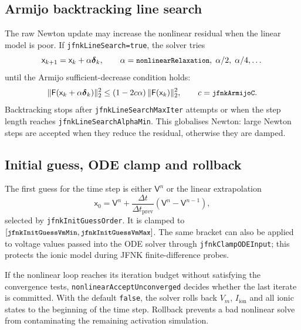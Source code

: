 \documentclass[11pt,a4paper]{article}
\newcommand{\Vm}{V_{m}}
\newcommand{\Iion}{I_{\text{ion}}}
\newcommand{\code}[1]{\texttt{\small #1}}
\begin{document}
\subsection{Armijo backtracking line search}

The raw Newton update may increase the nonlinear residual when the
linear model is poor. If \code{jfnkLineSearch=true}, the solver tries
\[
  \mathsf{x}_{k+1}=\mathsf{x}_{k}+\alpha\boldsymbol{\delta}_{k},
  \qquad
  \alpha=\code{nonlinearRelaxation},\;
  \alpha/2,\;\alpha/4,\dots
\]
until the Armijo sufficient-decrease condition holds:
\begin{equation}
  \lVert \mathsf{F}(\mathsf{x}_{k}+\alpha\boldsymbol{\delta}_{k})
  \rVert_2^2
  \le
  (1-2c\alpha)\,\lVert \mathsf{F}(\mathsf{x}_{k})\rVert_2^2,
  \qquad c=\code{jfnkArmijoC}.
  \label{eq:armijo}
\end{equation}
Backtracking stops after \code{jfnkLineSearchMaxIter} attempts or when
the step length reaches \code{jfnkLineSearchAlphaMin}. This globalises Newton:
large Newton steps are accepted when they reduce the residual, otherwise
they are damped.

\subsection{Initial guess, ODE clamp and rollback}

The first guess for the time step is either $\mathsf{V}^{n}$ or the
linear extrapolation
\begin{equation}
  \mathsf{x}_{0}
  =
  \mathsf{V}^{n}
  + \frac{\Delta t}{\Delta t_{\mathrm{prev}}}
    \left(\mathsf{V}^{n}-\mathsf{V}^{n-1}\right),
  \label{eq:extrap}
\end{equation}
selected by \code{jfnkInitGuessOrder}. It is clamped to
$[\code{jfnkInitGuessVmMin},\code{jfnkInitGuessVmMax}]$. The same
bracket can also be applied to voltage values passed into the ODE solver
through \code{jfnkClampODEInput}; this protects the ionic model during
JFNK finite-difference probes.

If the nonlinear loop reaches its iteration budget without satisfying
the convergence tests, \code{nonlinearAcceptUnconverged} decides whether
the last iterate is committed. With the default \code{false}, the solver
rolls back $\Vm$, $\Iion$ and all ionic states to the beginning of the
time step. Rollback prevents a bad nonlinear solve from contaminating
the remaining activation simulation.

\end{document}
